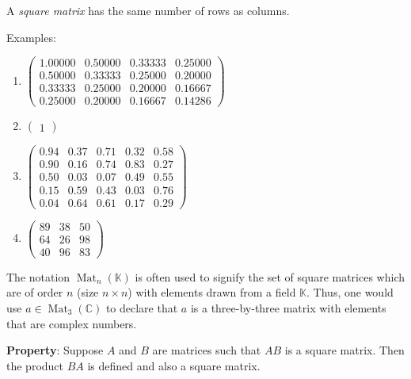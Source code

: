 \documentclass{article}
\begin{document}
A \emph{square matrix} has the same number of rows as columns.

Examples:

\begin{enumerate}

\item

$\begin{pmatrix}
  1.00000 & 0.50000 & 0.33333 & 0.25000 \\
  0.50000 & 0.33333 & 0.25000 & 0.20000 \\
  0.33333 & 0.25000 & 0.20000 & 0.16667 \\
  0.25000 & 0.20000 & 0.16667 & 0.14286
\end{pmatrix} $

\item

$\begin{pmatrix}1\end{pmatrix}$

\item
 
$\begin{pmatrix}
  0.94 & 0.37 & 0.71 & 0.32 & 0.58 \\
  0.90 & 0.16 & 0.74 & 0.83 & 0.27 \\
  0.50 & 0.03 & 0.07 & 0.49 & 0.55 \\
  0.15 & 0.59 & 0.43 & 0.03 & 0.76 \\
  0.04 & 0.64 & 0.61 & 0.17 & 0.29 
\end{pmatrix}$

\item

$\begin{pmatrix} 89 & 38 & 50 \\  64 & 26 & 98 \\  40 & 96 & 83 \end{pmatrix}$

\end{enumerate}

The notation $\operatorname{Mat}_n(\mathbb{K})$ is often used to signify the set of square matrices which are of order $n$ (size $n \times n$) with elements drawn from a field $\mathbb{K}$.  Thus, one would use $a \in  \operatorname{Mat}_3(\mathbb{C})$ to declare that $a$ is a three-by-three matrix   with elements that are complex numbers.

\textbf{Property}: Suppose $A$ and $B$ are matrices such that $AB$ is a square matrix.  Then the product $BA$ is defined and also a square matrix.
\end{document}
